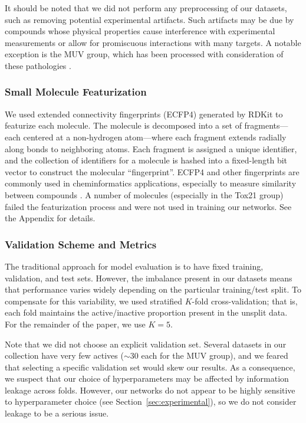 It should be noted that we did not perform any preprocessing of our
datasets, such as removing potential experimental artifacts. Such artifacts
may be due by compounds whose physical properties cause interference with
experimental measurements or allow for promiscuous interactions with many
targets. A notable exception is the MUV group, which has been processed
with consideration of these pathologies \cite{rohrer2009maximum}.

\subsubsection{Small Molecule Featurization}
We used extended connectivity fingerprints (ECFP4)
\cite{rogers2010extended} generated by RDKit \cite{landrumrdkit} to
featurize each molecule. The molecule is decomposed into a set of
fragments---each centered at a non-hydrogen atom---where each fragment
extends radially along bonds to neighboring atoms. Each fragment is
assigned a unique identifier, and the collection of identifiers for a
molecule is hashed into a fixed-length bit vector to construct the
molecular ``fingerprint''.  ECFP4 and other fingerprints are commonly used
in cheminformatics applications, especially to measure similarity between
compounds \cite{willett1998chemical}. A number of molecules (especially in
the Tox21 group) failed the featurization process and were not used in
training our networks. See the Appendix for details.

\subsubsection{Validation Scheme and Metrics}

The traditional approach for model evaluation is to have fixed training,
validation, and test sets.  However, the imbalance present in our datasets
means that performance varies widely depending on the particular
training/test split. To compensate for this variability, we used stratified
$K$-fold cross-validation; that is, each fold maintains the active/inactive
proportion present in the unsplit data. For the remainder of the paper, we
use $K=5$.

Note that we did not choose an explicit validation set. Several datasets in
our collection have very few actives ($\sim30$ each for the MUV group), and
we feared that selecting a specific validation set would skew our results.
As a consequence, we suspect that our choice of hyperparameters may be
affected by information leakage across folds. However, our networks do not
appear to be highly sensitive to hyperparameter choice (see
Section~\ref{sec:experimental}), so we do not consider leakage to be a
serious issue.

